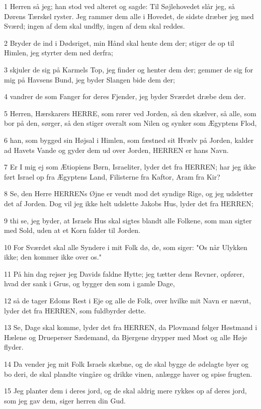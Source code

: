 \par 1 Herren så jeg; han stod ved alteret og sagde: Til Søjlehovedet slår jeg, så Dørens Tærskel ryster. Jeg rammer dem alle i Hovedet, de sidste dræber jeg med Sværd; ingen af dem skal undfly, ingen af dem skal reddes.
\par 2 Bryder de ind i Dødsriget, min Hånd skal hente dem der; stiger de op til Himlen, jeg styrter dem ned derfra;
\par 3 skjuler de sig på Karmels Top, jeg finder og henter dem der; gemmer de sig for mig på Havsens Bund, jeg byder Slangen bide dem der;
\par 4 vandrer de som Fanger for deres Fjender, jeg byder Sværdet dræbe dem der.
\par 5 Herren, Hærskarers HERRE, som rører ved Jorden, så den skælver, så alle, som bor på den, sørger, så den stiger overalt som Nilen og synker som Ægyptens Flod,
\par 6 han, som bygged sin Højsal i Himlen, som fæstned sit Hvælv på Jorden, kalder ad Havets Vande og gyder dem ud over Jorden, HERREN er hans Navn.
\par 7 Er I mig ej som Ætiopiens Børn, Israeliter, lyder det fra HERREN; har jeg ikke ført Israel op fra Ægyptens Land, Filisterne fra Kaftor, Aram fra Kir?
\par 8 Se, den Herre HERRENs Øjne er vendt mod det syndige Rige, og jeg udsletter det af Jorden. Dog vil jeg ikke helt udslette Jakobs Hus, lyder det fra HERREN;
\par 9 thi se, jeg byder, at Israels Hus skal sigtes blandt alle Folkene, som man sigter med Sold, uden at et Korn falder til Jorden.
\par 10 For Sværdet skal alle Syndere i mit Folk dø, de, som siger: "Os når Ulykken ikke; den kommer ikke over os."
\par 11 På hin dag rejser jeg Davids faldne Hytte; jeg tætter dens Revner, opfører, hvad der sank i Grus, og bygger den som i gamle Dage,
\par 12 så de tager Edoms Rest i Eje og alle de Folk, over hvilke mit Navn er nævnt, lyder det fra HERREN, som fuldbyrder dette.
\par 13 Se, Dage skal komme, lyder det fra HERREN, da Plovmand følger Høstmand i Hælene og Drueperser Sædemand, da Bjergene drypper med Most og alle Høje flyder.
\par 14 Da vender jeg mit Folk Israels skæbne, og de skal bygge de ødelagte byer og bo deri, de skal plandte vingåre og drikke vinen, anlægge haver og spise frugten.
\par 15 Jeg planter dem i deres jord, og de skal aldrig mere rykkes op af deres jord, som jeg gav dem, siger herren din Gud.


